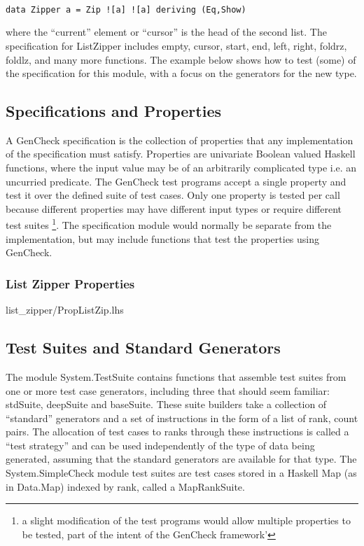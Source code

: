 \begin{verbatim}

data Zipper a = Zip ![a] ![a] deriving (Eq,Show)

\end{verbatim}

where the ``current'' element or ``cursor'' is the head of the second list.
The specification for ListZipper includes empty, cursor, start, end, left, right, foldrz, foldlz, 
and many more functions.  The example below shows how to test (some)
of the specification for this module, with a focus on the generators for the new type.

\subsection{Specifications and Properties}
A GenCheck specification is the collection of properties
that any implementation of the specification must satisfy.
Properties are univariate Boolean valued Haskell functions,
where the input value may be of an arbitrarily complicated type 
i.e. an uncurried predicate. The GenCheck test programs accept 
a single property and test it over the defined suite of test cases.
Only one property is tested per call because different properties 
may have different input types or require different test suites
\footnote{a slight modification of the test programs would 
allow multiple properties to be tested, part of the intent 
of the GenCheck framework'}.
The specification module would normally be separate from the implementation,
but may include functions that test the properties using GenCheck.

\subsubsection{List Zipper Properties}

 {list_zipper/PropListZip.lhs}

\subsection{Test Suites and Standard Generators}
The module System.TestSuite contains functions that assemble test suites 
from one or more test case generators, including three that should seem familiar: 
stdSuite, deepSuite and baseSuite.  These suite builders take a collection of 
``standard'' generators and a set of instructions in the form of  a list of rank, count pairs.  
The allocation of test cases to ranks through these instructions is called a ``test strategy'' 
and can be used independently of the type of data being generated, 
assuming that the standard generators are available for that type.
The System.SimpleCheck module test suites are test cases stored in 
a Haskell Map (as in Data.Map) indexed by rank, called a MapRankSuite.

